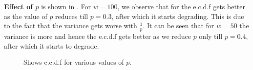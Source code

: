 \textbf{Effect of $p$} is shown in . For $w=100$, we observe that for  the e.c.d.f gets better as the value of $p$ reduces till $p=0.3$, after which it starts degrading. This is due to the fact that the variance gets worse with $\frac{1}p$. It can be seen that for $w=50$ the variance is more and hence the e.c.d.f gets better as we reduce $p$ only till $p=0.4$, after which it starts to degrade.

\FloatBarrier
\begin{figure}[h]
\caption{Shows e.c.d.f for various values of $p$.}
\label{fig:peff}
\end{figure}

